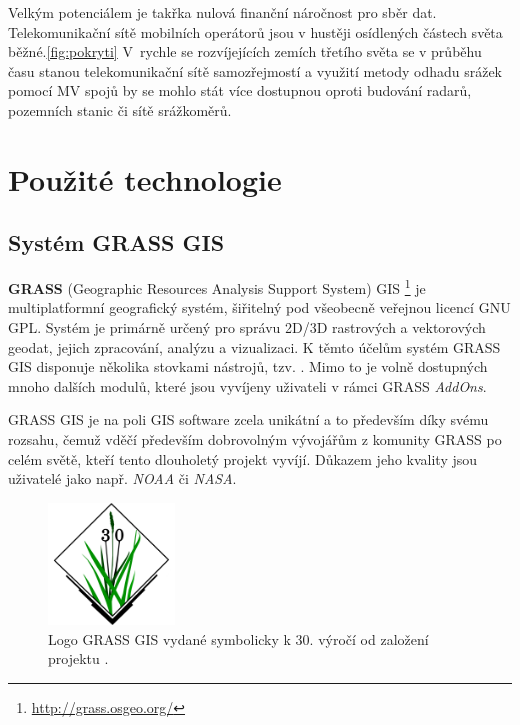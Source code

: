 \documentclass[a4paper,12pt,oneside]{report}
\begin{document}
Velkým potenciálem je takřka nulová finanční náročnost pro sběr
dat. Telekomunikační sítě mobilních operátorů jsou v hustěji
osídlených částech světa běžné.\ref{fig:pokryti} V~rychle se rozvíjejících zemích
třetího světa se v průběhu času stanou telekomunikační sítě
samozřejmostí a využití metody odhadu srážek pomocí MV spojů by se mohlo stát více
dostupnou oproti budování radarů, pozemních stanic či sítě
srážkoměrů.

\setcounter{footnote}{1}



\newpage
\setcounter{footnote}{1}
\section{Použité technologie}

\subsection{Systém GRASS GIS}
\textbf{GRASS} (Geographic Resources Analysis Support System) GIS
\footnote{\url{http://grass.osgeo.org/}} je multiplatformní
geografický systém, šiřitelný pod všeobecně veřejnou licencí \acs{GNU
  GPL}. Systém je primárně určený pro správu 2D/3D rastrových a
vektorových geodat, jejich zpracování, analýzu a vizualizaci. K těmto
účelům systém GRASS GIS disponuje několika stovkami nástrojů,
tzv. .  Mimo to je volně dostupných mnoho dalších modulů,
které jsou vyvíjeny uživateli v rámci GRASS \textit{AddOns}.

GRASS GIS je na poli GIS software zcela unikátní a to především díky
svému rozsahu, čemuž vděčí především dobrovolným vývojářům z komunity
GRASS po celém světě, kteří tento dlouholetý projekt vyvíjí. Důkazem jeho
kvality jsou uživatelé jako např.
\textit{NOAA} či %
\textit{NASA}.%

\begin{figure}[h!]
    \centering
    \includegraphics[width=0.3\textwidth]{./img/grass/grasslogo.png}
    \caption[Logo GRASS]{\centering Logo GRASS GIS vydané symbolicky k 30. výročí od založení projektu \footnotemark. }
 \end{figure}   
\end{document}
